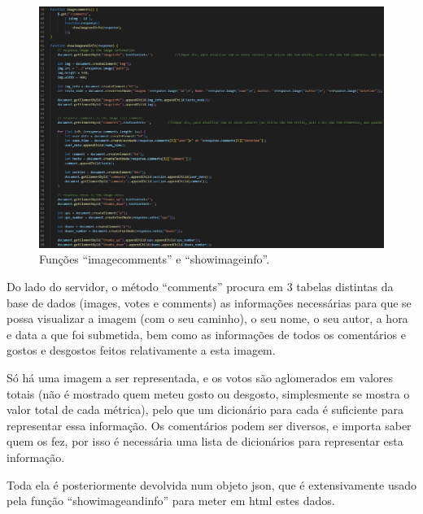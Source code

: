 \documentclass{report}
\begin{document}
\begin{figure}[!hbtp]
        \centering
        \includegraphics[scale=0.40]{Images_code/11 - js image 2.png}
        \caption{\label{Estrutura}Funções “imagecomments” e “showimageinfo”.}
\end{figure}

\bigskip

 Do lado do servidor, o método “comments” procura em 3 tabelas distintas da base de dados (images, votes e comments) as informações necessárias para que se possa visualizar a imagem (com o seu caminho), o seu nome, o seu autor, a hora e data a que foi submetida, bem como as informações de todos os comentários e gostos e desgostos feitos relativamente a esta imagem.
 

\newpage
 
	Só há uma imagem a ser representada, e os votos são aglomerados em valores totais (não é mostrado quem meteu gosto ou desgosto, simplesmente se mostra o valor total de cada métrica), pelo que um dicionário para cada é suficiente para representar essa informação. Os comentários podem ser diversos, e importa saber quem os fez, por isso é necessária uma lista de dicionários para representar esta informação.

 \linebreak
 \bigskip
 
	Toda ela é posteriormente devolvida num objeto json, que é extensivamente usado pela função “showimageandinfo” para meter em html estes dados.
\end{document}
